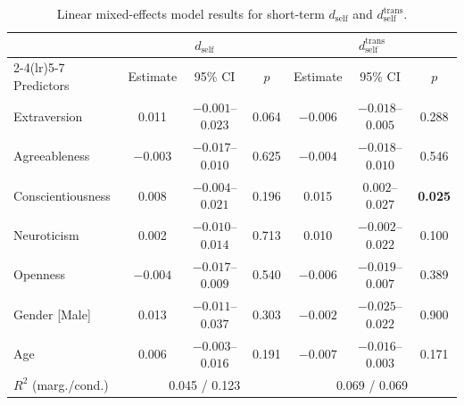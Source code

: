 \begin{table}[htbp]
\centering
\caption{Linear mixed-effects model results for short-term $d_{\text{self}}$ and $d_{\text{self}}^{\text{trans}}$. }
\label{tab:lmer_short_signature_min}
\begin{tabular}{lcccccc}
\toprule
& \multicolumn{3}{c}{$d_{\text{self}}$} & \multicolumn{3}{c}{$d_{\text{self}}^{\text{trans}}$} \\
\cmidrule(lr){2-4}\cmidrule(lr){5-7}
Predictors & Estimate & 95\% CI & $p$ & Estimate & 95\% CI & $p$ \\
\midrule
Extraversion           & 0.011   & $-0.001$--$0.023$ & 0.064 & $-0.006$ & $-0.018$--$0.005$ & 0.288 \\
Agreeableness          & $-0.003$& $-0.017$--$0.010$ & 0.625 & $-0.004$ & $-0.018$--$0.010$ & 0.546 \\
Conscientiousness      & 0.008   & $-0.004$--$0.021$ & 0.196 & 0.015    & $0.002$--$0.027$  & \textbf{0.025} \\
Neuroticism            & 0.002   & $-0.010$--$0.014$ & 0.713 & 0.010    & $-0.002$--$0.022$ & 0.100 \\
Openness               & $-0.004$& $-0.017$--$0.009$ & 0.540 & $-0.006$ & $-0.019$--$0.007$ & 0.389 \\
Gender [Male]          & 0.013   & $-0.011$--$0.037$ & 0.303 & $-0.002$ & $-0.025$--$0.022$ & 0.900 \\
Age                    & 0.006   & $-0.003$--$0.016$ & 0.191 & $-0.007$ & $-0.016$--$0.003$ & 0.171 \\
\midrule
$R^2$ (marg./cond.)    & \multicolumn{3}{c}{0.045 / 0.123} & \multicolumn{3}{c}{0.069 / 0.069} \\
\bottomrule
\end{tabular}
\end{table}